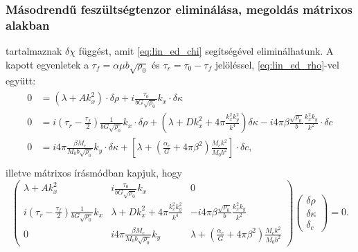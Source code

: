 \documentclass[10pt,a4paper]{scrartcl}
\begin{document}
\subsubsection{Másodrendű feszültségtenzor eliminálása, megoldás mátrixos alakban}
 tartalmaznak $\delta\chi$ függést, amit \cref{eq:lin_ed_chi} segítségével eliminálhatunk. A kapott egyenletek a ${\tau _f} = \alpha \mu b\sqrt {{\rho _0}} $ és ${\tau _r} = {\tau _0} - {\tau _f}$ jelöléssel, \cref{eq:lin_ed_rho}-vel együtt:
\begin{gather}\begin{aligned}
  0 &  = \left( {\lambda  + Ak_x^2} \right) \cdot \delta \rho  + i\frac{{{\tau _0}}}{{bG\sqrt {{\rho _0}} }}{k_x} \cdot \delta \kappa  \\ 
  0 &  = i\left( {{\tau _r} - \frac{{{\tau _f}}}{2}} \right)\frac{1}{{bG\sqrt {{\rho _0}} }}{k_x} \cdot \delta \rho  + \left( {\lambda  + Dk_x^2 + 4\pi \frac{{k_x^2 k_y^2}}{{{k^4}}}} \right)\delta \kappa  - i4\pi \beta \frac{{\sqrt {{\rho _0}} }}{b}\frac{{k_x^2{k_y}}}{{{k^2}}} \cdot \delta c \\ 
  0 &  =  i4\pi \frac{{\beta {M_c}}}{{M_0 b\sqrt {{\rho _0}} }}{k_y} \cdot \delta \kappa  + \left[ {\lambda  + \left( {\frac{\alpha _c}{G} + 4\pi {\beta ^2}} \right)\frac{{{M_c}{k^2}}}{{{M_0 b^2}}}} \right] \cdot \delta c, \\ 
\end{aligned}
\end{gather}
illetve mátrixos írásmódban kapjuk, hogy 
\begin{equation*}
\left({\begin{array}{*{20}{c}}
  {\lambda  + Ak_x^2}&{i\frac{{{\tau _0}}}{{bG\sqrt {{\rho _0}} }}{k_x}}&0 \\ 
  {i\left( {{\tau _r} - \frac{{{\tau _f}}}{2}} \right)\frac{1}{{bG\sqrt {{\rho _0}} }}{k_x}}&{\lambda  + Dk_x^2 + 4\pi \frac{{k_x^2 k_y^2}}{{{k^4}}}}&{ - i4\pi \beta \frac{{\sqrt {{\rho _0}} }}{b}\frac{{k_x^2{k_y}}}{{{k^2}}}} \\ 
  0&{ i4\pi \frac{{\beta {M_c}}}{{M_0 b\sqrt {{\rho _0}} }}{k_y} }&{\lambda  + \left( {\frac{\alpha _c}{G} + 4\pi {\beta ^2}} \right)\frac{{M_c}{k^2}}{M_0 b^2}} 
\end{array}} \right)\left( {\begin{array}{*{20}{c}}
  {\delta \rho } \\ 
  {\delta \kappa } \\ 
  {{\delta _c}} 
\end{array}} \right) = 0.
\end{equation*}
\end{document}
